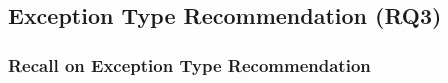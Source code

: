 \subsection{Exception Type Recommendation (RQ3)}
\label{sec:rq3}


\subsubsection{{\bf Recall on Exception Type Recommendation}}
\label{sec:req3-recall}

